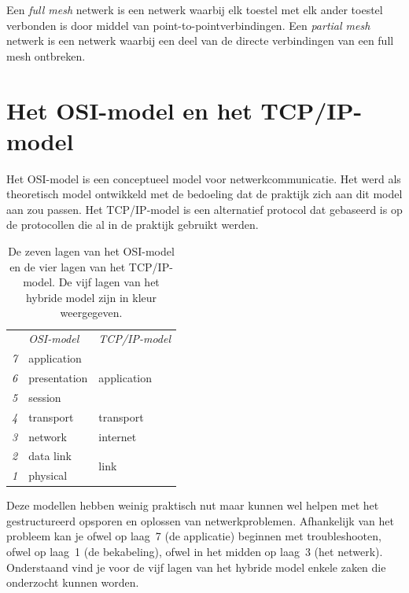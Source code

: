 Een \emph{full mesh} netwerk is een netwerk waarbij elk toestel met elk ander toestel verbonden is door middel van point-to-pointverbindingen.
Een \emph{partial mesh} netwerk is een netwerk waarbij een deel van de directe verbindingen van een full mesh ontbreken.

\section{Het OSI-model en het TCP/IP-model}

Het OSI-model is een conceptueel model voor netwerkcommunicatie.
Het werd als theoretisch model ontwikkeld met de bedoeling dat de praktijk zich aan dit model aan zou passen.
Het TCP/IP-model is een alternatief protocol dat gebaseerd is op de protocollen die al in de praktijk gebruikt werden.

\begin{table}[htp]
   \centering
   \begin{tabular}{rll}
     & \textit{OSI-model} & \textit{TCP/IP-model} \\[1ex]
   \textit{7} & application & \multirow{3}{*}{\textcolor{spot1}{application}} \\
   \textit{6} & presentation & \\
   \textit{5} & session & \\[1ex]
   \textit{4} & \textcolor{spot1}{transport} & transport \\[1ex]
   \textit{3} & \textcolor{spot1}{network} & internet \\[1ex]
   \textit{2} & \textcolor{spot1}{data link} & \multirow{2}{*}{link} \\
   \textit{1} & \textcolor{spot1}{physical} & \\
   \end{tabular}
   \caption{De zeven lagen van het OSI-model en de vier lagen van het TCP/IP-model.
   De vijf lagen van het hybride model zijn in kleur weergegeven.}
   \label{tab:osi-model}
\end{table}

Deze modellen hebben weinig praktisch nut maar kunnen wel helpen met het gestructureerd opsporen en oplossen van netwerkproblemen.
Afhankelijk van het probleem kan je ofwel op laag~7 (de applicatie) beginnen met troubleshooten, ofwel op laag~1 (de bekabeling), ofwel in het midden op laag~3 (het netwerk).
Onderstaand vind je voor de vijf lagen van het hybride model enkele zaken die onderzocht kunnen worden.

